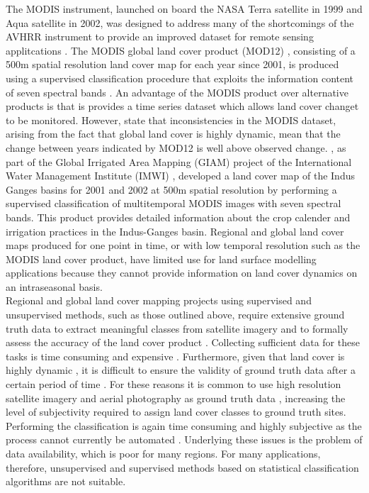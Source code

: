 \documentclass{icldt}\usepackage[]{graphicx}\usepackage[]{color}
\begin{document}
The MODIS instrument, launched on board the NASA Terra satellite in 1999 and Aqua satellite in 2002, was designed to address many of the shortcomings of the AVHRR instrument to provide an improved dataset for remote sensing applitcations \citep{Friedl2002}. The MODIS global land cover product (MOD12) \citep{Friedl2002}, consisting of a 500m spatial resolution land cover map for each year since 2001, is produced using a supervised classification procedure that exploits the information content of seven spectral bands \citep{Friedl2002}. An advantage of the MODIS product over alternative products is that is provides a time series dataset which allows land cover changet to be monitored. However, \citet{Friedl2010} state that inconsistencies in the MODIS dataset, arising from the fact that global land cover is highly dynamic, mean that the change between years indicated by MOD12 is well above observed change. \citet{Thenkabail2005}, as part of the Global Irrigated Area Mapping (GIAM) project of the International Water Management Institute (IMWI) \citep[e.g.][]{Thenkabail2009a}, developed a land cover map of the Indus Ganges basins for 2001 and 2002 at 500m spatial resolution by performing a supervised classification of multitemporal MODIS images with seven spectral bands. This product provides detailed information about the crop calender and irrigation practices in the Indus-Ganges basin. Regional and global land cover maps produced for one point in time, or with low temporal resolution such as the MODIS land cover product, have limited use for land surface modelling applications because they cannot provide information on land cover dynamics on an intraseasonal basis. \\

Regional and global land cover mapping projects using supervised and unsupervised methods, such as those outlined above, require extensive ground truth data to extract meaningful classes from satellite imagery and to formally assess the accuracy of the land cover product \citep{Nemani1997,Loveland2000,Cihlar2000}. Collecting sufficient data for these tasks is time consuming and expensive \citep{Thenkabail2005}. Furthermore, given that land cover is highly dynamic \citep{Foody2002}, it is difficult to ensure the validity of ground truth data after a certain period of time \citep{Friedl2002}. For these reasons it is common to use high resolution satellite imagery and aerial photography as ground truth data \citep[e.g.][]{Defries1998,Loveland2000,Gong2013}, increasing the level of subjectivity required to assign land cover classes to ground truth sites. Performing the classification is again time consuming and highly subjective as the process cannot currently be automated \citep{Loveland2000}. Underlying these issues is the problem of data availability, which is poor for many regions. For many applications, therefore, unsupervised and supervised methods based on statistical classification algorithms are not suitable. \\
\end{document}
